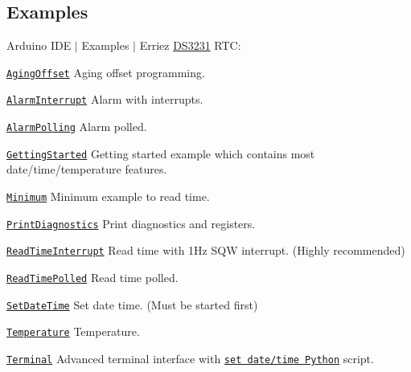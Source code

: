 \subsection*{Examples}

Arduino I\+DE $\vert$ Examples $\vert$ Erriez \hyperlink{class_d_s3231}{D\+S3231} R\+TC\+:


\begin{DoxyItemize}
\item \href{https://github.com/Erriez/ErriezDS3231/blob/master/examples/AgingOffset/AgingOffset.ino}{\tt Aging\+Offset} Aging offset programming.
\item \href{https://github.com/Erriez/ErriezDS3231/blob/master/examples/AlarmInterrupt/AlarmInterrupt.ino}{\tt Alarm\+Interrupt} Alarm with interrupts.
\item \href{https://github.com/Erriez/ErriezDS3231/blob/master/examples/AlarmPolling/AlarmPolling.ino}{\tt Alarm\+Polling} Alarm polled.
\item \href{https://github.com/Erriez/ErriezDS3231/blob/master/examples/GettingStarted/GettingStarted.ino}{\tt Getting\+Started} Getting started example which contains most date/time/temperature features.
\item \href{https://github.com/Erriez/ErriezDS3231/blob/master/examples/Minimum/Minimum.ino}{\tt Minimum} Minimum example to read time.
\item \href{https://github.com/Erriez/ErriezDS3231/blob/master/examples/PrintDiagnostics/PrintDiagnostics.ino}{\tt Print\+Diagnostics} Print diagnostics and registers.
\item \href{https://github.com/Erriez/ErriezDS3231/blob/master/examples/ReadTimeInterrupt/ReadTimeInterrupt.ino}{\tt Read\+Time\+Interrupt} Read time with 1\+Hz S\+QW interrupt. (Highly recommended)
\item \href{https://github.com/Erriez/ErriezDS3231/blob/master/examples/ReadTimePolled/ReadTimePolled.ino}{\tt Read\+Time\+Polled} Read time polled.
\item \href{https://github.com/Erriez/ErriezDS3231/blob/master/examples/SetDateTime/SetDateTime.ino}{\tt Set\+Date\+Time} Set date time. (Must be started first)
\item \href{https://github.com/Erriez/ErriezDS3231/blob/master/examples/Temperature/Temperature.ino}{\tt Temperature} Temperature.
\item \href{https://github.com/Erriez/ErriezDS3231/blob/master/examples/Terminal/Terminal.ino}{\tt Terminal} Advanced terminal interface with \href{https://github.com/Erriez/ErriezDS3231/blob/master/examples/Terminal/Terminal.py}{\tt set date/time Python} script.
\end{DoxyItemize}

